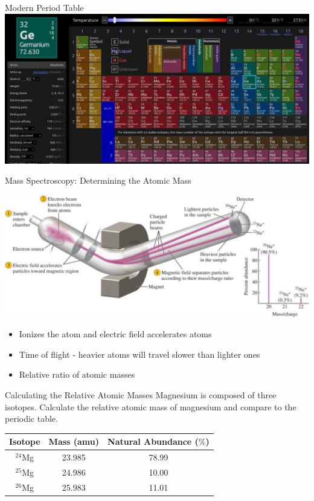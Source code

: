 \documentclass[11pt]{beamer}
\begin{document}
\begin{frame}{Modern Period Table}
  \centering
  \includegraphics[width=\linewidth]{ptable}
\end{frame}

\begin{frame}{Mass Spectroscopy: Determining the Atomic Mass}
  \begin{center}
    \includegraphics[width=\linewidth]{mass_spect}
  \end{center}

  \begin{itemize}
  \item Ionizes the atom and electric field accelerates atoms
  \item Time of flight - heavier atoms will travel slower
    than lighter ones
  \item Relative ratio of atomic masses
  \end{itemize}
\end{frame}

\begin{frame}{Calculating the Relative Atomic Masses}
  Magnesium is composed of three isotopes. Calculate the
  relative atomic mass of magnesium and compare to the periodic
  table.
  \begin{center}
  \begin{tabular}{ccc}
    Isotope & Mass (amu) & Natural Abundance ($\%$) \\
    \hline
    $^{24}$Mg & 23.985 & 78.99 \\
    $^{25}$Mg & 24.986 & 10.00 \\
    $^{26}$Mg & 25.983 & 11.01
  \end{tabular}
  \end{center}
\end{frame}
\end{document}
